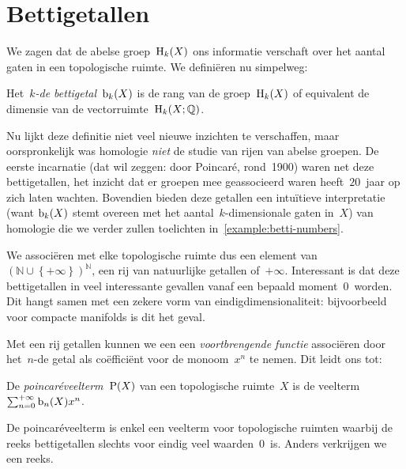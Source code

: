 \documentclass[a4paper,11pt,openany,oneside,article]{memoir}
\begin{document}
\clearpage

\section{Bettigetallen}\label{section:betti-numbers}
We zagen dat de abelse groep~$\mathrm{H}_k(X)$ ons informatie verschaft over het aantal gaten in een topologische ruimte. We defini\"eren nu simpelweg:
\begin{definition}
  Het~\emph{$k$\nobreakdash-de bettigetal~$\mathrm{b}_k(X)$} is de rang van de groep~$\mathrm{H}_k(X)$ of equivalent de dimensie van de vectorruimte~$\mathrm{H}_k(X;\mathbb{Q})$.
\end{definition}

Nu lijkt deze definitie niet veel nieuwe inzichten te verschaffen, maar oorspronkelijk was homologie \emph{niet} de studie van rijen van abelse groepen. De eerste incarnatie (dat wil zeggen: door Poincar\'e, rond~1900) waren net deze bettigetallen, het inzicht dat er groepen mee geassocieerd waren heeft~$20$~jaar op zich laten wachten. Bovendien bieden deze getallen een intu\"itieve interpretatie (want $\mathrm{b}_k(X)$ stemt overeen met het aantal~$k$\nobreakdash-dimensionale gaten in~$X$) van homologie die we verder zullen toelichten in~\cref{example:betti-numbers}.

We associ\"eren met elke topologische ruimte dus een element van~$(\mathbb{N}\cup\left\{ +\infty \right\})^\mathbb{N}$, een rij van natuurlijke getallen of~$+\infty$. Interessant is dat deze bettigetallen in veel interessante gevallen vanaf een bepaald moment~$0$~worden. Dit hangt samen met een zekere vorm van eindigdimensionaliteit: bijvoorbeeld voor compacte manifolds is dit het geval.

Met een rij getallen kunnen we een een \emph{voortbrengende functie} associ\"eren door het~$n$\nobreakdash-de getal als co\"effici\"ent voor de monoom~$x^n$ te nemen. Dit leidt ons tot:

\begin{definition}
  De \emph{poincar\'eveelterm}~$\mathrm{P}(X)$ van een topologische ruimte~$X$ is de veelterm~$\sum_{n=0}^{+\infty}\mathrm{b}_n(X) x^n$.
\end{definition}

\begin{remark}
  De poincar\'eveelterm is enkel een veelterm voor topologische ruimten waarbij de reeks bettigetallen slechts voor eindig veel waarden~$0$~is. Anders verkrijgen we een reeks.
\end{remark}
\end{document}
